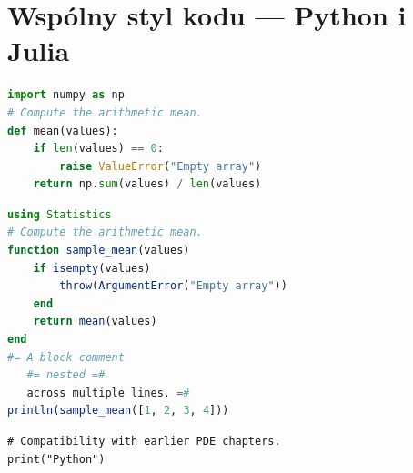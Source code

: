 \documentclass[11pt,a4paper]{article}
\begin{document}
\section*{Wspólny styl kodu — Python i Julia}
\begin{lstlisting}[language=Python,caption={Obliczanie średniej}]
import numpy as np
# Compute the arithmetic mean.
def mean(values):
    if len(values) == 0:
        raise ValueError("Empty array")
    return np.sum(values) / len(values)
\end{lstlisting}
\begin{lstlisting}[language=Julia,caption={Obliczanie średniej}]
using Statistics
# Compute the arithmetic mean.
function sample_mean(values)
    if isempty(values)
        throw(ArgumentError("Empty array"))
    end
    return mean(values)
end
#= A block comment
   #= nested =#
   across multiple lines. =#
println(sample_mean([1, 2, 3, 4]))
\end{lstlisting}
\begin{lstlisting}[style=pythonpde]
# Compatibility with earlier PDE chapters.
print("Python")
\end{lstlisting}
\end{document}
